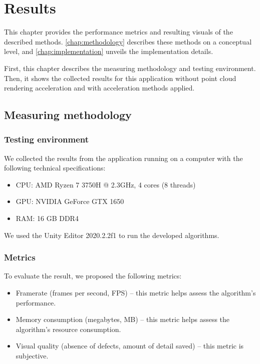 \chapter{Results}
\label{chap:implementation}

\graphicspath{{figs/implementation/}}

This chapter provides the performance metrics and resulting visuals of the described methods. \autoref{chap:methodology} describes these methods on a conceptual level, and \autoref{chap:implementation} unveils the implementation details.

First, this chapter describes the measuring methodology and testing environment. Then, it shows the collected results for this application without point cloud rendering acceleration and with acceleration methods applied.


\section{Measuring methodology}

\subsection{Testing environment}

We collected the results from the application running on a computer with the following technical specifications:

\begin{itemize}
    \item CPU: AMD Ryzen 7 3750H @ 2.3GHz, 4 cores (8 threads)
    \item GPU: NVIDIA GeForce GTX 1650
    \item RAM: 16 GB DDR4
\end{itemize}

We used the Unity Editor 2020.2.2f1 to run the developed algorithms.

\subsection{Metrics}

To evaluate the result, we proposed the following metrics:

\begin{itemize}
    \item Framerate (frames per second, FPS) – this metric helps assess the algorithm's performance.
    \item Memory consumption (megabytes, MB) – this metric helps assess the algorithm's resource consumption.
    \item Visual quality (absence of defects, amount of detail saved) – this metric is subjective.
\end{itemize}


